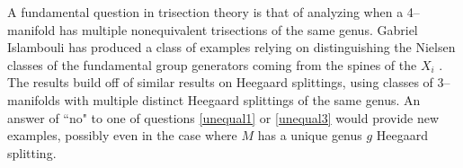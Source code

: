 \documentclass[12pt]{amsart}
\theoremstyle{definition}
\theoremstyle{remark}
\begin{document}
A fundamental question in trisection theory is that of analyzing when a 4--manifold has multiple nonequivalent trisections of the same genus.
Gabriel Islambouli has produced a class of examples relying on distinguishing the Nielsen classes of the fundamental group generators coming from the spines of the $X_i$ \cite{Islambouli1}.
The results build off of similar results on Heegaard splittings, using classes of 3--manifolds with multiple distinct Heegaard splittings of the same genus.
An answer of ``no" to one of questions \ref{unequal1} or \ref{unequal3} would provide new examples, possibly even in the case where $M$ has a unique genus $g$ Heegaard splitting.



{}


%

%
\end{document}
